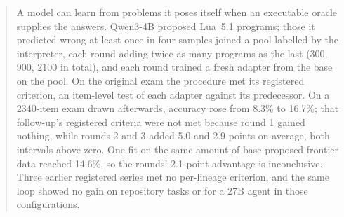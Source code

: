 
\begin{abstract}
A model can learn from problems it poses itself when an executable oracle supplies the answers.
Qwen3-4B proposed Lua~5.1 programs; those it predicted wrong at least once in four samples joined a pool
labelled by the interpreter, each round adding twice as many programs as the last (300, 900, 2100 in
total), and each round trained a fresh adapter from the base on the pool. On the original exam the
procedure met its registered criterion, an item-level test of each adapter against its predecessor. On a
2340-item exam drawn afterwards, accuracy rose from 8.3\% to 16.7\%; that follow-up's registered criteria
were not met because round 1 gained nothing, while rounds 2 and 3 added 5.0 and 2.9 points on average,
both intervals above zero. One fit on the same amount of base-proposed frontier data reached 14.6\%, so
the rounds' 2.1-point advantage is inconclusive. Three earlier
registered series met no per-lineage criterion, and the same loop showed no gain on repository tasks or
for a 27B agent in those configurations.
\end{abstract}
